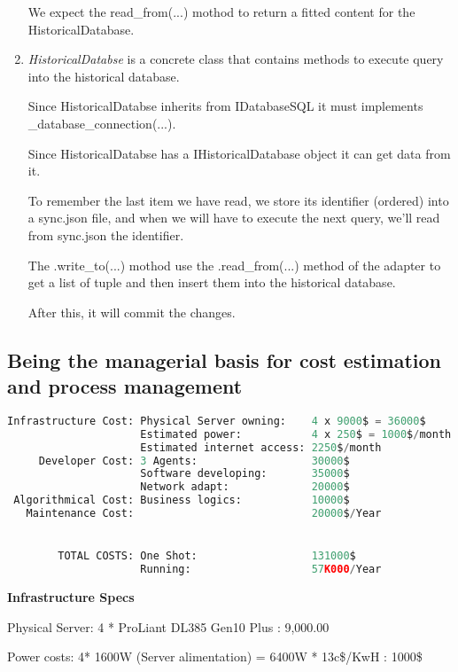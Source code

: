\begin{enumerate}
     We expect the read\_from(...) mothod to return a fitted content for the HistoricalDatabase. 

	\item \textit{HistoricalDatabse} is a concrete class that contains methods to execute query into the historical database.
	
     Since HistoricalDatabse inherits from IDatabaseSQL it must implements \_database\_connection(...).
    
     Since HistoricalDatabse has a IHistoricalDatabase object it can get data from it.
     
     To remember the last item we have read, we store its identifier (ordered) into a sync.json file, and when we will have to execute the next query, we'll read from sync.json the identifier.
        
     The .write\_to(...) mothod use the .read\_from(...) method of the adapter to get a list of tuple and then insert them into the historical database. 
     
     After this, it will commit the changes.
\end{enumerate}

\subsection{Being the managerial basis for cost estimation and process management}

\begin{lstlisting}[language=Python, numbers=none]
Infrastructure Cost: Physical Server owning:    4 x 9000$ = 36000$
                     Estimated power:           4 x 250$ = 1000$/month
                     Estimated internet access: 2250$/month
     Developer Cost: 3 Agents:                  30000$
                     Software developing:       35000$
                     Network adapt:             20000$
 Algorithmical Cost: Business logics:           10000$
   Maintenance Cost:                            20000$/Year


        TOTAL COSTS: One Shot:                  131000$
                     Running:                   57K000/Year 
\end{lstlisting}

\textbf{Infrastructure Specs}

Physical Server: 4 * ProLiant DL385 Gen10 Plus : 9,000.00 

Power costs:     4* 1600W (Server alimentation) = 6400W * 13c\$/KwH : 1000\$

